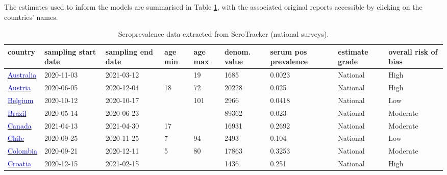 The estimates used to inform the models are summarised in Table \ref{tab:sero_national}, with the associated original reports accessible by clicking on the countries' names.

\begin{table}[!ht]  
    \footnotesize
    \begin{center}
        \caption{Seroprevalence data extracted from SeroTracker (national surveys).}
        \label{tab:sero_national}
        \begin{tabular}{p{2cm} | p{1.6cm} | p{1.6cm} | p{0.8cm} | p{0.8cm} | p{1cm} | p{1.3cm} | p{1.2cm} | p{1.2cm}}
           \hline            
           \textbf{country} & \textbf{sampling start date} & \textbf{sampling end date} & \textbf{age min} & \textbf{age max} & \textbf{denom. value} & \textbf{serum pos prevalence} & \textbf{estimate grade} & \textbf{overall risk of bias} \\ 
           \hline 
           \href{https://dx.doi.org/10.5694/mja2.51542}{\textcolor{blue}{Australia}} & 2020-11-03 & 2021-03-12 &  & 19 & 1685 & 0.0023 & National & High \\ 
           \hline 
           \href{https://dx.doi.org/10.1007/s15010-021-01639-0}{\textcolor{blue}{Austria}} & 2020-06-05 & 2020-12-04 & 18 & 72 & 20228 & 0.025 & National & High \\ 
           \hline 
           \href{https://dx.doi.org/10.2807/1560-7917.ES.2022.27.9.2100419}{\textcolor{blue}{Belgium}} & 2020-10-12 & 2020-10-17 &  & 101 & 2966 & 0.0418 & National & Low \\ 
           \hline 
           \href{https://www.ncbi.nlm.nih.gov/pmc/articles/PMC8225319/}{\textcolor{blue}{Brazil}} & 2020-05-14 & 2020-06-23 &  &  & 89362 & 0.023 & National & Moderate \\ 
           \hline 
           \href{https://serotracker.com/en/Explore}{\textcolor{blue}{Canada}} & 2021-04-13 & 2021-04-30 & 17 &  & 16931 & 0.2692 & National & Moderate \\ 
           \hline 
           \href{https://dx.doi.org/10.1186/s12879-022-07045-7}{\textcolor{blue}{Chile}} & 2020-09-25 & 2020-11-25 & 7 & 94 & 2493 & 0.104 & National & Low \\ 
           \hline 
           \href{https://dx.doi.org/10.1016/j.lana.2022.100195}{\textcolor{blue}{Colombia}} & 2020-09-21 & 2020-12-11 & 5 & 80 & 17863 & 0.3253 & National & Moderate \\ 
           \hline 
           \href{https://dx.doi.org/10.3390/pathogens10060774}{\textcolor{blue}{Croatia}} & 2020-12-15 & 2021-02-15 &  &  & 1436 & 0.251 & National & High \\ 

\end{tabular}
\end{center}
\end{table}
